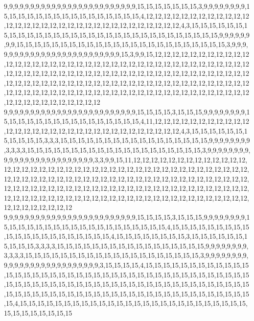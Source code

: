 9,9,9,9,9,9,9,9,9,9,9,9,9,9,9,9,9,9,9,9,9,9,9,9,9,15,15,15,15,15,15,15,3,9,9,9,9,9,9,9,9,15,15,15,15,15,15,15,15,15,15,15,15,15,15,15,15,4,12,12,12,12,12,12,12,12,12,12,12,12,12,12,12,12,12,12,12,12,12,12,12,12,12,12,12,12,12,12,12,12,4,3,15,15,15,15,15,15,15,15,15,15,15,15,15,15,15,15,15,15,15,15,15,15,15,15,15,15,15,15,15,15,15,9,9,9,9,9,9,9,9,15,15,15,15,15,15,15,15,15,15,15,15,15,15,15,15,15,15,15,15,15,15,15,15,3,9,9,9,9,9,9,9,9,9,9,9,9,9,9,9,9,9,9,9,9,9,9,9,9,9,15,3,9,9,15,12,12,12,12,12,12,12,12,12,12,12,12,12,12,12,12,12,12,12,12,12,12,12,12,12,12,12,12,12,12,12,12,12,12,12,12,12,12,12,12,12,12,12,12,12,12,12,12,12,12,12,12,12,12,12,12,12,12,12,12,12,12,12,12,12,12,12,12,12,12,12,12,12,12,12,12,12,12,12,12,12,12,12,12,12,12,12,12,12,12,12,12,12,12,12,12,12,12,12,12,12,12,12,12,12,12,12,12,12,12,12,12,12,12,12,12,12,12,12,12,12,12,12,12,12,12,12,12,12,12,12,12,12,12
9,9,9,9,9,9,9,9,9,9,9,9,9,9,9,9,9,9,9,9,9,9,9,9,9,15,15,15,15,3,15,15,15,9,9,9,9,9,9,9,9,15,15,15,15,15,15,15,15,15,15,15,15,15,15,15,15,4,11,12,12,12,12,12,12,12,12,12,12,12,12,12,12,12,12,12,12,12,12,12,12,12,12,12,12,12,12,12,12,12,4,3,15,15,15,15,15,15,15,15,15,15,15,3,3,3,15,15,15,15,15,15,15,15,15,15,15,15,15,15,15,15,15,9,9,9,9,9,9,9,9,3,3,3,3,15,15,15,15,15,15,15,15,15,15,15,15,15,15,15,15,15,15,15,15,3,9,9,9,9,9,9,9,9,9,9,9,9,9,9,9,9,9,9,9,9,9,9,9,9,9,3,3,9,9,15,11,12,12,12,12,12,12,12,12,12,12,12,12,12,12,12,12,12,12,12,12,12,12,12,12,12,12,12,12,12,12,12,12,12,12,12,12,12,12,12,12,12,12,12,12,12,12,12,12,12,12,12,12,12,12,12,12,12,12,12,12,12,12,12,12,12,12,12,12,12,12,12,12,12,12,12,12,12,12,12,12,12,12,12,12,12,12,12,12,12,12,12,12,12,12,12,12,12,12,12,12,12,12,12,12,12,12,12,12,12,12,12,12,12,12,12,12,12,12,12,12,12,12,12,12,12,12,12,12,12,12,12,12,12
9,9,9,9,9,9,9,9,9,9,9,9,9,9,9,9,9,9,9,9,9,9,9,9,9,15,15,15,15,3,15,15,15,9,9,9,9,9,9,9,9,15,15,15,15,15,15,15,15,15,15,15,15,15,15,15,15,15,15,15,4,15,15,15,15,15,15,15,15,15,15,15,15,15,15,15,15,15,15,15,15,15,4,15,15,15,15,15,15,15,15,3,15,15,15,15,15,15,15,15,15,15,3,3,3,3,15,15,15,15,15,15,15,15,15,15,15,15,15,15,15,15,15,9,9,9,9,9,9,9,9,3,3,3,3,15,15,15,15,15,15,15,15,15,15,15,15,15,15,15,15,15,15,15,15,3,9,9,9,9,9,9,9,9,9,9,9,9,9,9,9,9,9,9,9,9,9,9,9,9,9,9,3,15,15,15,15,4,15,15,15,15,15,15,15,15,15,15,15,15,15,15,15,15,15,15,15,15,15,15,15,15,15,15,15,15,15,15,15,15,15,15,15,15,15,15,15,15,15,15,15,15,15,15,15,15,15,15,15,15,15,15,15,15,15,15,15,15,15,15,15,15,15,15,15,15,15,15,15,15,15,15,15,15,15,15,15,15,15,15,15,15,15,15,15,15,15,15,15,15,15,15,15,15,15,4,15,15,15,15,15,15,15,15,15,15,15,15,15,15,15,15,15,15,15,15,15,15,15,15,15,15,15,15,15,15,15,15,15,15
